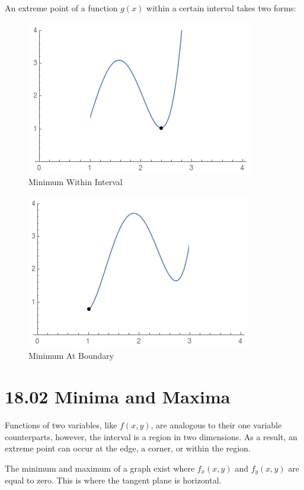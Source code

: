 \documentclass{article}
\begin{document}
An extreme point of a function $g(x)$ within a certain interval takes two forms:

\begin{figure}[H]
  \centering
  \includegraphics[scale=0.60]{"Minimum"}
  \caption{Minimum Within Interval}
\end{figure}

\begin{figure}[H]
  \centering
  \includegraphics[scale=0.60]{"MinimumAtBoundary"}
  \caption{Minimum At Boundary}
\end{figure}

\section{18.02 Minima and Maxima}

Functions of two variables, like $f(x, y)$, are analogous to their one variable
counterparts, however, the interval is a region in two dimensions. As a result,
an extreme point can occur at the edge, a corner, or within the region.

\bigbreak

The minimum and maximum of a graph exist where $f_{x}(x, y)$ and $f_{y}(x, y)$
are equal to zero. This is where the tangent plane is horizontal.
\end{document}
